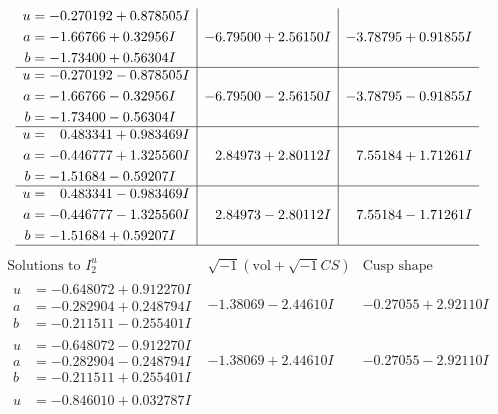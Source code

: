 \documentclass[1p]{elsarticle_modified}
\theoremstyle{definition}
\newcommand{\I}{\sqrt{-1}}
\begin{document}
$$\begin{array}{c|c|c}
\begin{aligned}
u &= -0.270192 + 0.878505 I \\
a &= -1.66766 + 0.32956 I \\
b &= -1.73400 + 0.56304 I\end{aligned}
 & -6.79500 + 2.56150 I & -3.78795 + 0.91855 I \\ \hline\begin{aligned}
u &= -0.270192 - 0.878505 I \\
a &= -1.66766 - 0.32956 I \\
b &= -1.73400 - 0.56304 I\end{aligned}
 & -6.79500 - 2.56150 I & -3.78795 - 0.91855 I \\ \hline\begin{aligned}
u &= \phantom{-}0.483341 + 0.983469 I \\
a &= -0.446777 + 1.325560 I \\
b &= -1.51684 - 0.59207 I\end{aligned}
 & \phantom{-}2.84973 + 2.80112 I & \phantom{-}7.55184 + 1.71261 I \\ \hline\begin{aligned}
u &= \phantom{-}0.483341 - 0.983469 I \\
a &= -0.446777 - 1.325560 I \\
b &= -1.51684 + 0.59207 I\end{aligned}
 & \phantom{-}2.84973 - 2.80112 I & \phantom{-}7.55184 - 1.71261 I\\
 \hline 
 \end{array}$$\newpage$$\begin{array}{c|c|c}  
\text{Solutions to }I^u_{2}& \I (\text{vol} + \sqrt{-1}CS) & \text{Cusp shape}\\
 \hline 
\begin{aligned}
u &= -0.648072 + 0.912270 I \\
a &= -0.282904 + 0.248794 I \\
b &= -0.211511 - 0.255401 I\end{aligned}
 & -1.38069 - 2.44610 I & -0.27055 + 2.92110 I \\ \hline\begin{aligned}
u &= -0.648072 - 0.912270 I \\
a &= -0.282904 - 0.248794 I \\
b &= -0.211511 + 0.255401 I\end{aligned}
 & -1.38069 + 2.44610 I & -0.27055 - 2.92110 I \\ \hline\begin{aligned}
u &= -0.846010 + 0.032787 I \\

\end{aligned}
\end{array}$$
\end{document}
